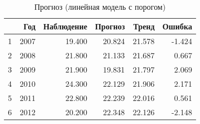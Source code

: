 \begin{table}[ht]
\centering
\begin{tabular}{rrrrrr}
  \hline
 & Год & Наблюдение & Прогноз & Тренд & Ошибка \\ 
  \hline
1 & 2007 & 19.400 & 20.824 & 21.578 & -1.424 \\ 
  2 & 2008 & 21.800 & 21.133 & 21.687 & 0.667 \\ 
  3 & 2009 & 21.900 & 19.831 & 21.797 & 2.069 \\ 
  4 & 2010 & 24.300 & 22.129 & 21.906 & 2.171 \\ 
  5 & 2011 & 22.800 & 22.239 & 22.016 & 0.561 \\ 
  6 & 2012 & 20.200 & 22.348 & 22.126 & -2.148 \\ 
   \hline
\end{tabular}
\caption{Прогноз (линейная модель с порогом)} 
\label{table:lin-fit-cv-prediction}
\end{table}
